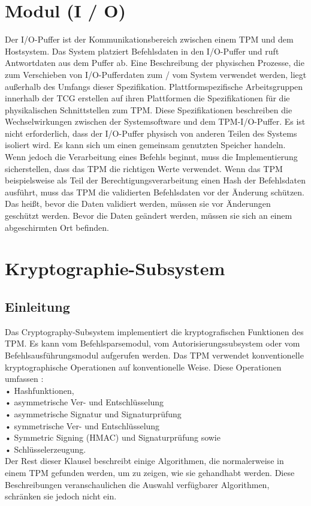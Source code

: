 \clearpage
\newpage

\section{Modul (I / O)}
Der I/O-Puffer ist der Kommunikationsbereich zwischen einem TPM und dem Hostsystem. Das System platziert Befehlsdaten in den I/O-Puffer und ruft Antwortdaten aus dem Puffer ab.
Eine Beschreibung der physischen Prozesse, die zum Verschieben von I/O-Pufferdaten zum / vom System verwendet werden, liegt außerhalb des Umfangs dieser Spezifikation. Plattformspezifische Arbeitsgruppen innerhalb der TCG erstellen auf ihren Plattformen die Spezifikationen für die physikalischen Schnittstellen zum TPM. Diese Spezifikationen beschreiben die Wechselwirkungen zwischen der Systemsoftware und dem TPM-I/O-Puffer.
Es ist nicht erforderlich, dass der I/O-Puffer physisch von anderen Teilen des Systems isoliert wird. Es kann sich um einen gemeinsam genutzten Speicher handeln. Wenn jedoch die Verarbeitung eines Befehls beginnt, muss die Implementierung sicherstellen, dass das TPM die richtigen Werte verwendet. Wenn das TPM beispielsweise als Teil der Berechtigungsverarbeitung einen Hash der Befehlsdaten ausführt, muss das TPM die validierten Befehlsdaten vor der Änderung schützen. Das heißt, bevor die Daten validiert werden, müssen sie vor Änderungen geschützt werden. Bevor die Daten geändert werden, müssen sie sich an einem abgeschirmten Ort befinden.

\section{Kryptographie-Subsystem}
\subsection{Einleitung}
Das Cryptography-Subsystem implementiert die kryptografischen Funktionen des TPM. Es kann vom Befehlsparsemodul, vom Autorisierungssubsystem oder vom Befehlsausführungsmodul aufgerufen werden. Das TPM verwendet konventionelle kryptographische Operationen auf konventionelle Weise. Diese Operationen umfassen : \\
• Hashfunktionen,  \\
• asymmetrische Ver- und Entschlüsselung \\
• asymmetrische Signatur und Signaturprüfung \\
• symmetrische Ver- und Entschlüsselung \\
• Symmetric Signing (HMAC) und Signaturprüfung sowie \\
• Schlüsselerzeugung. \\
Der Rest dieser Klausel beschreibt einige Algorithmen, die normalerweise in einem TPM gefunden werden, um zu zeigen, wie sie gehandhabt werden. Diese Beschreibungen veranschaulichen die Auswahl verfügbarer Algorithmen, schränken sie jedoch nicht ein.
